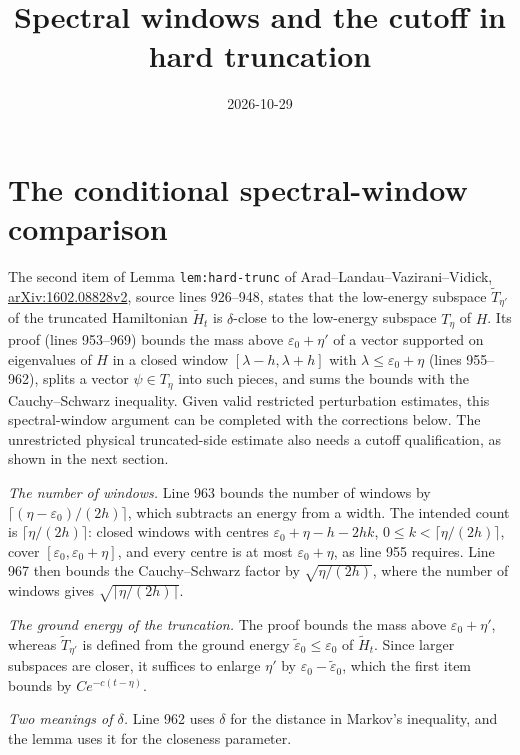 \documentclass{article}
\title{Spectral windows and the cutoff in hard truncation}
\author{}
\date{2026-10-29}
\begin{document}
\maketitle
{}

\section{The conditional spectral-window comparison}

The second item of Lemma \texttt{lem:hard-trunc} of
Arad--Landau--Vazirani--Vidick,
\href{https://arxiv.org/abs/1602.08828}{arXiv:1602.08828v2}, source lines
926--948, states that the low-energy subspace $\tilde T_{\eta'}$ of the
truncated Hamiltonian $\tilde H_t$ is $\delta$-close to the low-energy
subspace $T_\eta$ of $H$. Its proof (lines 953--969) bounds the mass above
$\varepsilon_0+\eta'$ of a vector supported on eigenvalues of $H$ in a
closed window $[\lambda-h,\lambda+h]$ with $\lambda\le\varepsilon_0+\eta$
(lines 955--962), splits a vector $\psi\in T_\eta$ into such pieces, and sums
the bounds with the Cauchy--Schwarz inequality. Given valid restricted
perturbation estimates, this spectral-window argument can be completed with
the corrections below. The unrestricted physical truncated-side estimate
also needs a cutoff qualification, as shown in the next section.

\emph{The number of windows.} Line 963 bounds the number of windows by
$\lceil(\eta-\varepsilon_0)/(2h)\rceil$, which subtracts an energy from a
width. The intended count is $\lceil\eta/(2h)\rceil$: closed windows with
centres $\varepsilon_0+\eta-h-2hk$, $0\le k<\lceil\eta/(2h)\rceil$, cover
$[\varepsilon_0,\varepsilon_0+\eta]$, and every centre is at most
$\varepsilon_0+\eta$, as line 955 requires. Line 967 then bounds the
Cauchy--Schwarz factor by $\sqrt{\eta/(2h)}$, where the number of windows
gives $\sqrt{\lceil\eta/(2h)\rceil}$.

\emph{The ground energy of the truncation.} The proof bounds the mass above
$\varepsilon_0+\eta'$, whereas $\tilde T_{\eta'}$ is defined from the ground
energy $\tilde\varepsilon_0\le\varepsilon_0$ of $\tilde H_t$. Since larger
subspaces are closer, it suffices to enlarge $\eta'$ by
$\varepsilon_0-\tilde\varepsilon_0$, which the first item bounds by
$Ce^{-c(t-\eta)}$.

\emph{Two meanings of $\delta$.} Line 962 uses $\delta$ for the distance in
Markov's inequality, and the lemma uses it for the closeness parameter.
\end{document}
